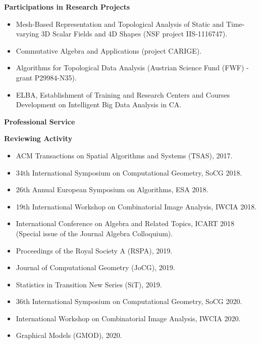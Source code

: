 \documentclass[11pt]{article}
\begin{document}
\vspace*{2.5ex}
\noindent
{\Large\bf Participations in Research Projects}
\begin{itemize}
\item Mesh-Based Representation and Topological Analysis of Static and Time-varying 3D Scalar Fields and 4D Shapes (NSF project IIS-1116747).
\item Commutative Algebra and Applications (project CARIGE).
\item Algorithms for Topological Data Analysis (Austrian Science Fund (FWF) - grant P29984-N35).
\item ELBA, Establishment of Training and Research Centers and Courses Development on Intelligent Big Data Analysis in CA.
\end{itemize}




\vspace*{2.5ex}
\noindent
{\Large\bf Professional Service}

\vspace*{1.5ex}
\noindent
{\bf Reviewing Activity}
\begin{itemize}
  \item ACM Transactions on Spatial Algorithms and Systems (TSAS), 2017.
  \item 34th International Symposium on Computational Geometry, SoCG 2018.
  \item 26th Annual European Symposium on Algorithms, ESA 2018.
  \item 19th International Workshop on Combinatorial Image Analysis, IWCIA 2018.
  \item International Conference on Algebra and Related Topics, ICART 2018 (Special issue of the Journal Algebra Colloquium).
  \item Proceedings of the Royal Society A (RSPA), 2019.
  \item Journal of Computational Geometry (JoCG), 2019.
  \item Statistics in Transition New Series (SiT), 2019.
  \item 36th International Symposium on Computational Geometry, SoCG 2020.
  \item International Workshop on Combinatorial Image Analysis, IWCIA 2020.
  \item Graphical Models (GMOD), 2020.
\end{itemize}
\end{document}
